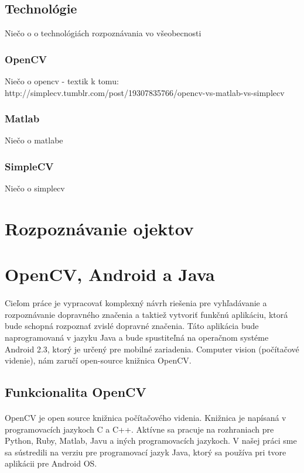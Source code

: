 \documentclass[12pt]{article}
\begin{document}
\subsection{Technológie}
Niečo o o technológiách rozpoznávania vo všeobecnosti
\subsubsection{OpenCV}
Niečo o opencv - textik k tomu:
http://simplecv.tumblr.com/post/19307835766/opencv-vs-matlab-vs-simplecv
\subsubsection{Matlab}
Niečo o matlabe
\subsubsection{SimpleCV}
Niečo o simplecv

\section{Rozpoznávanie ojektov}
\section{OpenCV, Android a Java}
\paragraph{}
Cieľom práce je vypracovať komplexný návrh riešenia pre vyhľadávanie a rozpoznávanie dopravného značenia a taktiež vytvoriť funkčnú aplikáciu, ktorá
bude schopná rozpoznať zvislé dopravné značenia. Táto aplikácia bude naprogramovaná v jazyku Java a bude spustiteľná na
 operačnom systéme Android 2.3, ktorý je určený pre mobilné zariadenia. Computer vision (počítačové videnie), nám zaručí open-source knižnica OpenCV.
\subsection{Funkcionalita OpenCV}
\paragraph{}
OpenCV je open source knižnica počítačového videnia. Knižnica je napísaná v programovacích jazykoch C a C++. Aktívne sa pracuje na
rozhraniach pre Python, Ruby, Matlab, Javu a iných programovacích jazykoch. V našej práci sme sa sústredili na verziu pre programovací jazyk Java,
ktorý sa používa pri tvore aplikácii pre Android OS.
\cite{learning_opencv}
\end{document}
